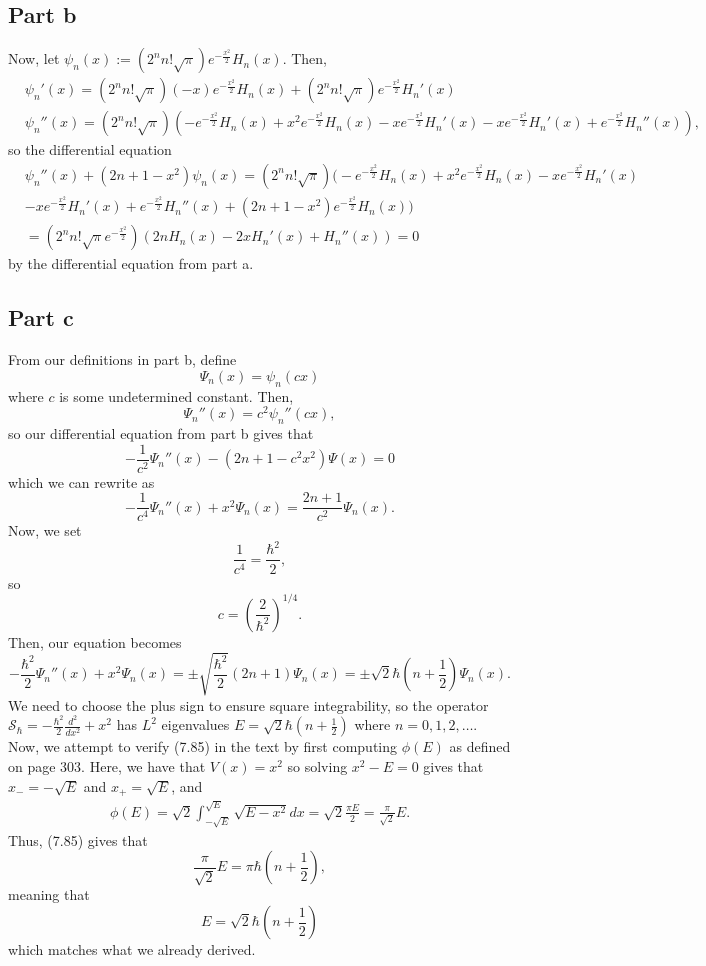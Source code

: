 \documentclass{article}
\begin{document}
\subsection{Part b}
Now, let $\psi_n(x) := (2^n n! \sqrt{\pi}) e^{-\frac{x^2}{2}} H_n(x)$. Then,
\begin{align*}
&\psi_n'(x)=(2^n n! \sqrt{\pi})(-x)e^{-\frac{x^2}{2}} H_n(x)+(2^n n! \sqrt{\pi}) e^{-\frac{x^2}{2}} H_n'(x)\\
&\psi_n''(x)=(2^n n! \sqrt{\pi})\left(-e^{-\frac{x^2}{2}} H_n(x)+x^2e^{-\frac{x^2}{2}} H_n(x)-xe^{-\frac{x^2}{2}} H_n'(x)-xe^{-\frac{x^2}{2}} H_n'(x)+e^{-\frac{x^2}{2}} H_n''(x)\right),
\end{align*}
so the differential equation
\begin{align*}
&\psi_n''(x) + (2n + 1 - x^2) \psi_n(x) =(2^n n! \sqrt{\pi})\big(-e^{-\frac{x^2}{2}} H_n(x)+x^2e^{-\frac{x^2}{2}} H_n(x)-xe^{-\frac{x^2}{2}} H_n'(x)\\&-xe^{-\frac{x^2}{2}} H_n'(x)+e^{-\frac{x^2}{2}} H_n''(x)+ (2n + 1 - x^2)e^{-\frac{x^2}{2}}H_n(x)\big)\\&=
\left(2^n n! \sqrt{\pi}e^{-\frac{x^2}{2}}\right)\left(2nH_n(x)-2xH_n'(x)+H_n''(x)\right)=0
\end{align*}
by the differential equation from part a.
\subsection{Part c}
From our definitions in part b, define
\[
\Psi_n(x)=\psi_n(cx)
\]
where $c$ is some undetermined constant. Then, 
\[
\Psi_n''(x)=c^2\psi_n''(cx),
\]
so our differential equation from part b gives that 
\[
-\frac{1}{c^2}\Psi_n''(x)-(2n+1-c^2x^2)\Psi(x)=0
\]
which we can rewrite as
\[
-\frac{1}{c^4}\Psi_n''(x)+x^2\Psi_n(x)=\frac{2n+1}{c^2}\Psi_n(x).
\]
Now, we set 
\[
\frac{1}{c^4}=\frac{\hbar^2}{2},
\]
so
\[
c=\left(\frac{2}{\hbar^2}\right)^{1/4}.
\]
Then, our equation becomes
\[
-\frac{\hbar^2}{2}\Psi_n''(x)+x^2\Psi_n(x)=\pm\sqrt{\frac{\hbar^2}{2}}(2n+1)\Psi_n(x)=\pm\sqrt{2}\hbar\left(n+\frac{1}{2}\right)\Psi_n(x).
\]
We need to choose the plus sign to ensure square integrability, so  the operator $\mathcal S_\hbar = - \frac{\hbar^2}{2} \frac{d^2}{d x^2} + x^2$ has $L^2$ eigenvalues $E=\sqrt{2}\hbar\left(n+\frac{1}{2}\right)$ where $n = 0,1,2,\ldots$.\\
Now, we attempt to verify (7.85) in the text by first computing $\phi(E)$ as defined on page 303. Here, we have that $V(x)=x^2$ so solving $x^2-E=0$ gives that $x_-=-\sqrt{E}$ and $x_+=\sqrt{E}$, and
\begin{align*}
\phi(E)=\sqrt{2}\int_{-\sqrt{E}}^{\sqrt{E}}\sqrt{E-x^2}dx=\sqrt{2}\frac{\pi E}{2}=\frac{\pi}{\sqrt{2}}E.
\end{align*}
Thus, (7.85) gives that 
\[
\frac{\pi}{\sqrt{2}}E=\pi\hbar\left(n+\frac{1}{2}\right),
\]
meaning that 
\[
E=\sqrt{2}\hbar\left(n+\frac{1}{2}\right)
\]
which matches what we already derived.
\end{document}

